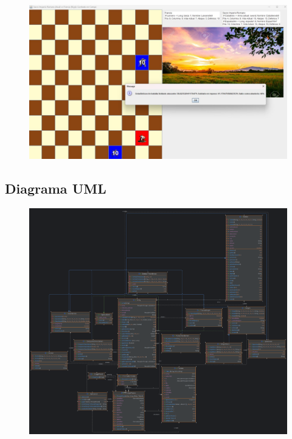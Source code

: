 \documentclass{article}
\begin{document}
	\begin{figure}[H]
		\centering
		\includegraphics[width=1\textwidth,keepaspectratio]{img/test.jpg}
	\end{figure}
	
	
	
	\subsection{Diagrama UML}
	
	\begin{figure}[H]
		\centering
		\includegraphics[width=1\textwidth,keepaspectratio]{img/uml.png}
	\end{figure}
	
\end{document}
